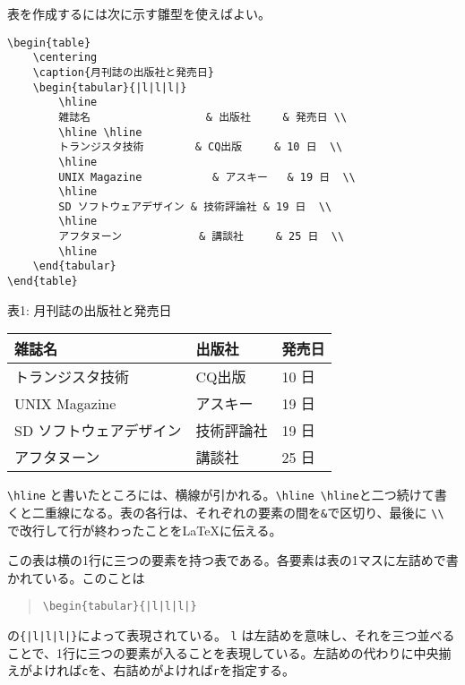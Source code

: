 表を作成するには次に示す雛型を使えばよい。
\begin{reidai}
    \begin{verbatim}
\begin{table}
    \centering
    \caption{月刊誌の出版社と発売日}
    \begin{tabular}{|l|l|l|}
        \hline
        雑誌名                  & 出版社     & 発売日 \\
        \hline \hline
        トランジスタ技術        & CQ出版     & 10 日  \\
        \hline
        UNIX Magazine           & アスキー   & 19 日  \\
        \hline
        SD ソフトウェアデザイン & 技術評論社 & 19 日  \\
        \hline
        アフタヌーン            & 講談社     & 25 日  \\
        \hline
    \end{tabular}
\end{table}
\end{verbatim}
\end{reidai}
\vspace*{-1.5em}
\begin{kekka}
    \centering
    表1: 月刊誌の出版社と発売日 \\
    \begin{tabular}{|l|l|l|}
        \hline
        雑誌名                  & 出版社     & 発売日 \\
        \hline \hline
        トランジスタ技術        & CQ出版     & 10 日  \\
        \hline
        UNIX Magazine           & アスキー   & 19 日  \\
        \hline
        SD ソフトウェアデザイン & 技術評論社 & 19 日  \\
        \hline
        アフタヌーン            & 講談社     & 25 日  \\
        \hline
    \end{tabular}
\end{kekka} \noindent
\verb|\hline| と書いたところには、横線が引かれる。\verb|\hline \hline|と二つ続けて書くと二重線になる。表の各行は、それぞれの要素の間を\texttt{\&}で区切り、最後に \texttt{\textbackslash \textbackslash} で改行して行が終わったことを\LaTeX に伝える。

この表は横の1行に三つの要素を持つ表である。各要素は表の1マスに左詰めで書かれている。このことは
\begin{quotation}
    \verb-\begin{tabular}{|l|l|l|}-
\end{quotation}
の\verb-{|l|l|l|}-によって表現されている。 \texttt{l} は左詰めを意味し、それを三つ並べることで、1行に三つの要素が入ることを表現している。左詰めの代わりに中央揃えがよければ\texttt{c}を、右詰めがよければ\texttt{r}を指定する。

